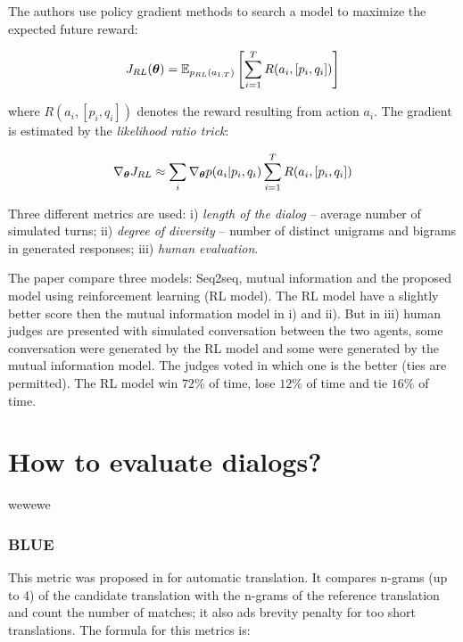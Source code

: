 \par The authors use policy gradient methods to search a model to maximize the expected future reward:

\begin{equation}
J_{RL}(\bm{\theta}) = \operatorname{\mathbb{E}}_{p_{RL}(a_{1:T})} \left[\sum_{i=1}^{T} R(a_i, [p_i, q_i]) \right]
\end{equation}

where $R(a_i, [p_i, q_i])$ denotes the reward resulting from action $a_i$. The gradient is estimated by the \textit{likelihood ratio trick}:

\begin{equation}
\nabla_{\bm{\theta}} {J_{RL}} \approx \sum_{i} \nabla_{\bm{\theta}} {p(a_{i} | p_{i}, q_{i})} \sum_{i=1}^{T}R(a_i, [p_{i}, q_{i}])
\end{equation}

\par Three different metrics are used: i) \textit{length of the dialog} -- average number of simulated turns; ii) \textit{degree of diversity} -- number of distinct unigrams and bigrams in generated responses; iii) \textit{human evaluation}.

\par The paper compare three models: Seq2seq, mutual information and the proposed model using reinforcement learning (RL model). The RL model have a slightly better score then the mutual information model in i) and ii). But in iii) human judges are presented with simulated conversation between the two agents, some conversation were generated by the RL model and some were generated by the mutual information model. The judges voted in which one is the better (ties are permitted).  The RL model win $72\%$ of time, lose $12\%$ of time and tie $16\%$ of time.

\section{How to evaluate dialogs?}

wewewe
\subsubsection{BLUE}
This metric was proposed in \cite{Papineni2001} for automatic translation. It compares n-grams (up to 4) of the candidate translation with the n-grams of the reference translation and count the number of matches; it also ads brevity penalty for too short translations. The formula for this metrics is:


